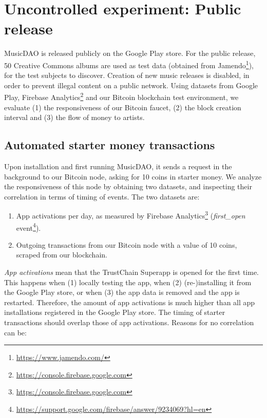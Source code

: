 
\section{Uncontrolled experiment: Public release}
MusicDAO is released publicly on the Google Play store. For the public release, 50 Creative Commons albums are used as test data (obtained from Jamendo\footnote{\url{https://www.jamendo.com/}}), for the test subjects to discover. Creation of new music releases is disabled, in order to prevent illegal content on a public network. Using datasets from Google Play, Firebase Analytics\footnote{\url{https://console.firebase.google.com}} and our Bitcoin blockchain test environment, we evaluate (1) the responsiveness of our Bitcoin faucet, (2) the block creation interval and (3) the flow of money to artists. 

\subsection{Automated starter money transactions}
\label{chap:starter-money-flow}
Upon installation and first running MusicDAO, it sends a request in the background to our Bitcoin node, asking for 10 coins in starter money. We analyze the responsiveness of this node by obtaining two datasets, and inspecting their correlation in terms of timing of events. The two datasets are: 
\begin{enumerate}
    \item App activations per day, as measured by Firebase Analytics\footnote{\url{https://console.firebase.google.com}} (\textit{first\_open} event\footnote{\url{https://support.google.com/firebase/answer/9234069?hl=en}}).
    \item Outgoing transactions from our Bitcoin node with a value of 10 coins, scraped from our blockchain.
\end{enumerate}

\textit{App activations} mean that the TrustChain Superapp is opened for the first time. This happens when (1) locally testing the app, when (2) (re-)installing it from the Google Play store, or when (3) the app data is removed and the app is restarted. Therefore, the amount of app activations is much higher than all app installations registered in the Google Play store. The timing of starter transactions should overlap those of app activations. Reasons for no correlation can be:

